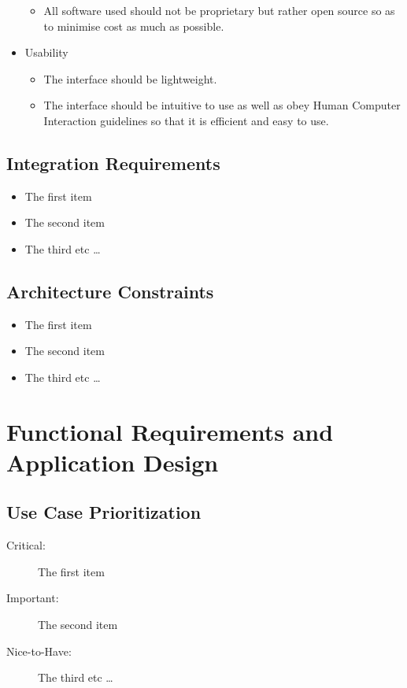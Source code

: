 \documentclass{article}
\begin{document}
\begin{itemize}
\begin{itemize}
					\item All software used should not be proprietary but rather open source so as to minimise cost as much as possible.
				\end{itemize}
				\item Usability
				\begin{itemize}
					\item The interface should be lightweight.
					\item The interface should be intuitive to use as well as obey Human Computer Interaction guidelines so that it is efficient and easy to use.
				\end{itemize}
			\end{itemize}
		
		\subsection{Integration Requirements}\label{subsec:integration}
			\begin{itemize}
			  	\item The first item
			  	\item The second item
			  	\item The third etc \ldots
			\end{itemize}
		
		\subsection{Architecture Constraints}\label{subsec:constraints}
			\begin{itemize}
			  \item The first item
			  \item The second item
			  \item The third etc \ldots
			\end{itemize}
		
	\cleardoublepage
	\section{Functional Requirements and Application Design}\label{sec:functional}
		\subsection{Use Case Prioritization}
			\begin{description}
			  \item[Critical:] The first item
			  \item[Important:] The second item
			  \item[Nice-to-Have:] The third etc \ldots
			\end{description}
			
\end{document}
